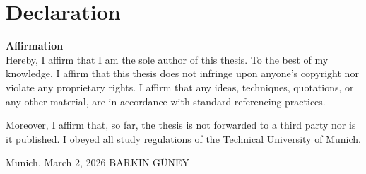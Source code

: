 \chapter*{Declaration}
\thispagestyle{plain}
%

\vspace{1cm}

\textbf{Affirmation}\\
Hereby, I affirm that I am the sole author of this thesis. To the best of my knowledge, I affirm
that this thesis does not infringe upon anyone's copyright nor violate any proprietary rights.
I affirm that any ideas, techniques, quotations, or any other material, are in accordance with
standard referencing practices.

Moreover, I affirm that, so far, the thesis is not forwarded to a third party nor is it published.
I obeyed all study regulations of the Technical University of Munich.


\vspace*{2.5cm}
\hspace*{1cm} Munich, March 2, 2026  \hspace*{4cm}          BARKIN GÜNEY

